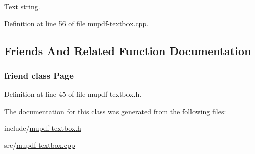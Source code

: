 Text string. 



Definition at line 56 of file mupdf-\/textbox.\-cpp.



\subsection{Friends And Related Function Documentation}
\hypertarget{class_mu_p_d_f_1_1_text_box_a66d145c56e1747e0aecb5309042ab183}{
\subsubsection[{Page}]{\setlength{\rightskip}{0pt plus 5cm}friend class {\bf Page}\hspace{0.3cm}{\ttfamily [friend]}}}\label{class_mu_p_d_f_1_1_text_box_a66d145c56e1747e0aecb5309042ab183}


Definition at line 45 of file mupdf-\/textbox.\-h.



The documentation for this class was generated from the following files\-:\begin{DoxyCompactItemize}
\item 
include/\hyperlink{mupdf-textbox_8h}{mupdf-\/textbox.\-h}\item 
src/\hyperlink{mupdf-textbox_8cpp}{mupdf-\/textbox.\-cpp}\end{DoxyCompactItemize}
